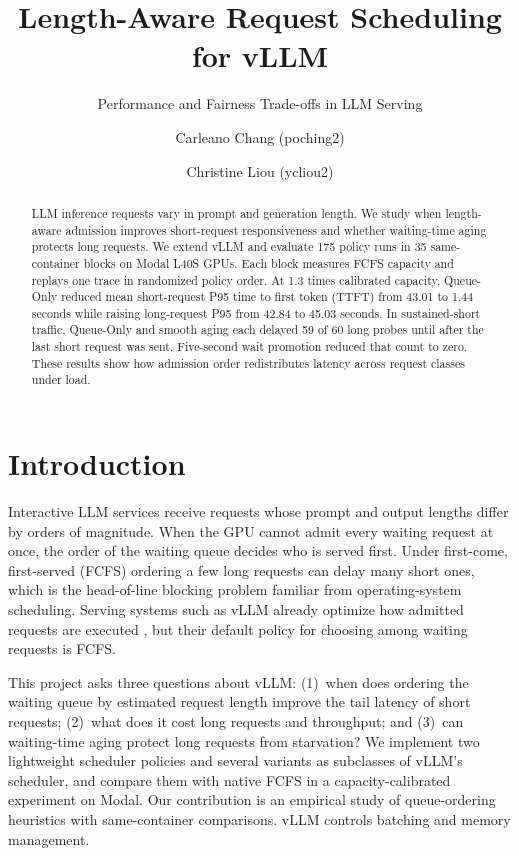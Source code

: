 \documentclass[sigplan,nonacm]{acmart}
\title{Length-Aware Request Scheduling for vLLM}
\subtitle{Performance and Fairness Trade-offs in LLM Serving}
\author{Carleano Chang (poching2)}
\author{Christine Liou (ycliou2)}
\begin{document}
\begin{abstract}
LLM inference requests vary in prompt and generation length. We study
when length-aware admission improves short-request responsiveness and
whether waiting-time aging protects long requests. We extend vLLM and
evaluate 175 policy runs in 35 same-container blocks on Modal L40S GPUs.
Each block measures FCFS capacity and replays one trace in randomized
policy order. At 1.3 times calibrated capacity, Queue-Only reduced mean
short-request P95 time to first token (TTFT) from 43.01 to 1.44 seconds
while raising long-request P95 from 42.84 to 45.03 seconds.
In sustained-short traffic, Queue-Only and smooth aging each delayed
59 of 60 long probes until after the last short request was sent.
Five-second wait promotion reduced that count to zero. These results show how
admission order redistributes latency across request classes under load.
\end{abstract}

\maketitle
\pagestyle{plain}
\thispagestyle{plain}



\section{Introduction}
\label{sec:intro}

Interactive LLM services receive requests whose prompt and output
lengths differ by orders of magnitude. When the GPU cannot admit every
waiting request at once, the order of the waiting queue decides who is
served first. Under first-come, first-served (FCFS) ordering a few long
requests can delay many short ones, which is the head-of-line blocking
problem familiar from operating-system scheduling. Serving systems such
as vLLM already optimize how admitted requests are executed
\cite{kwon2023efficient}, but their default policy for choosing among
waiting requests is FCFS.

This project asks three questions about vLLM: (1)~when does ordering
the waiting queue by estimated request length improve the tail latency
of short requests; (2)~what does it cost long requests and throughput;
and (3)~can waiting-time aging protect long requests from starvation?
We implement two lightweight scheduler policies and several variants as
subclasses of vLLM's scheduler, and compare them with native FCFS in a
capacity-calibrated experiment on Modal. Our contribution is an
empirical study of queue-ordering heuristics with same-container
comparisons. vLLM controls batching and memory management.
\end{document}
